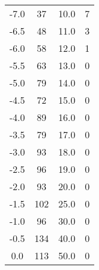 \begin{table}
\begin{tabular}{c c || c c}
        -7.0     &   37     &    10.0      &   7    \\
        -6.5   &   48     &    11.0      &   3    \\
        -6.0     &   58     &    12.0      &   1    \\
        -5.5   &   63     &    13.0      &   0    \\
        -5.0     &   79     &    14.0      &   0    \\
        -4.5   &   72     &    15.0      &   0    \\
        -4.0     &   89     &    16.0      &   0    \\
        -3.5   &   79     &    17.0      &   0    \\
        -3.0     &   93     &    18.0      &   0    \\
        -2.5   &   96     &    19.0      &   0    \\
        -2.0     &   93     &    20.0      &   0    \\
        -1.5   &   102    &    25.0      &   0    \\
        -1.0     &   96     &    30.0      &   0    \\
        -0.5   &   134    &    40.0      &   0    \\
        0.0      &   113    &       50.0   &   0    \\
    \end{tabular}
\end{table}
 

